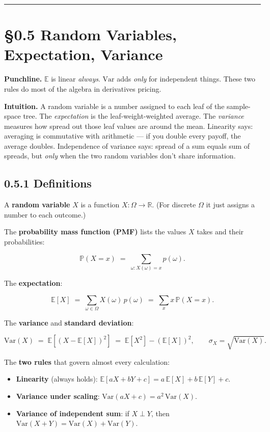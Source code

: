 \documentclass[
  10pt,
  twoside]{book}
\providecommand{\tightlist}{%
  \setlength{\itemsep}{0pt}\setlength{\parskip}{0pt}}
\begin{document}
\begin{center}\rule{0.5\linewidth}{0.5pt}\end{center}

\section{§0.5 Random Variables, Expectation,
Variance}\label{random-variables-expectation-variance}

\textbf{Punchline.} \(\mathbb{E}\) is linear \emph{always}.
\(\mathrm{Var}\) adds \emph{only} for independent things. These two
rules do most of the algebra in derivatives pricing.

\textbf{Intuition.} A random variable is a number assigned to each leaf
of the sample-space tree. The \emph{expectation} is the
leaf-weight-weighted average. The \emph{variance} measures how spread
out those leaf values are around the mean. Linearity says: averaging is
commutative with arithmetic --- if you double every payoff, the average
doubles. Independence of variance says: spread of a sum equals sum of
spreads, but \emph{only} when the two random variables don't share
information.

\subsection{0.5.1 Definitions}\label{definitions-2}

A \textbf{random variable} \(X\) is a function
\(X : \Omega \to \mathbb{R}\). (For discrete \(\Omega\) it just assigns
a number to each outcome.)

The \textbf{probability mass function (PMF)} lists the values \(X\)
takes and their probabilities:

\[\mathbb{P}(X = x) \;=\; \sum_{\omega : X(\omega) = x} p(\omega).\]

The \textbf{expectation}:

\[\mathbb{E}[X] \;=\; \sum_{\omega \in \Omega} X(\omega)\, p(\omega) \;=\; \sum_{x} x\, \mathbb{P}(X = x).\]

The \textbf{variance} and \textbf{standard deviation}:

\[\mathrm{Var}(X) \;=\; \mathbb{E}\!\left[(X - \mathbb{E}[X])^2\right] \;=\; \mathbb{E}[X^2] - (\mathbb{E}[X])^2, \qquad \sigma_X = \sqrt{\mathrm{Var}(X)}.\]

The \textbf{two rules} that govern almost every calculation:

\begin{itemize}
\tightlist
\item
  \textbf{Linearity} (always holds):
  \(\mathbb{E}[aX + bY + c] = a\,\mathbb{E}[X] + b\,\mathbb{E}[Y] + c\).
\item
  \textbf{Variance under scaling}:
  \(\mathrm{Var}(aX + c) = a^2\,\mathrm{Var}(X)\).
\item
  \textbf{Variance of independent sum}: if \(X \perp Y\), then
  \(\mathrm{Var}(X + Y) = \mathrm{Var}(X) + \mathrm{Var}(Y)\).
\end{itemize}
\end{document}
